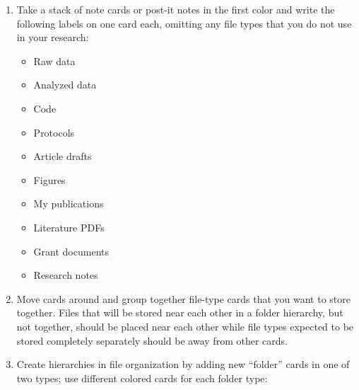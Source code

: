 \documentclass[
]{book}
\providecommand{\tightlist}{%
  \setlength{\itemsep}{0pt}\setlength{\parskip}{0pt}}
\begin{document}
\begin{enumerate}
\def\labelenumi{\arabic{enumi}.}
\tightlist
\item
  Take a stack of note cards or post-it notes in the first color and write the following labels on one card each, omitting any file types that you do not use in your research:

  \begin{itemize}
  \tightlist
  \item
    Raw data
  \item
    Analyzed data
  \item
    Code
  \item
    Protocols
  \item
    Article drafts
  \item
    Figures
  \item
    My publications
  \item
    Literature PDFs
  \item
    Grant documents
  \item
    Research notes
  \end{itemize}
\item
  Move cards around and group together file-type cards that you want to store together. Files that will be stored near each other in a folder hierarchy, but not together, should be placed near each other while file types expected to be stored completely separately should be away from other cards.
\item
  Create hierarchies in file organization by adding new ``folder'' cards in one of two types; use different colored cards for each folder type:


\end{enumerate}
\end{document}
